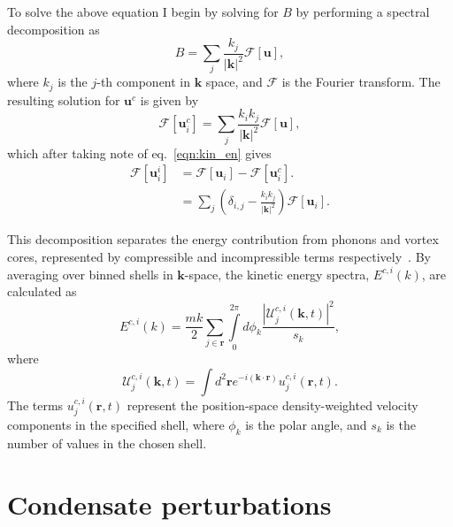 To solve the above equation I begin by solving for $B$ by performing a spectral decomposition as
\begin{equation}
    B = \displaystyle\sum\limits_{j} \frac{k_j}{|\mathbf{k}|^2}\mathscr{F}[\mathbf{u}],
\end{equation}
where $k_j$ is the $j$-th component in $\mathbf{k}$ space, and $\mathscr{F}$ is the Fourier transform. The resulting solution for $\mathbf{u}^c$ is given by
\begin{equation}
    \mathscr{F}[\mathbf{u}_i^c] = \displaystyle\sum\limits_{j} \frac{k_i k_j}{|\mathbf{k}|^2} \mathscr{F}[\mathbf{u}],
\end{equation}
which after taking note of eq.~\ref{eqn:kin_en} gives
\begin{align}
    \mathscr{F}[\mathbf{u}_i^i] &= \mathscr{F}[\mathbf{u}_i] - \mathscr{F}[\mathbf{u}_i^c]. \\
    &= \displaystyle\sum\limits_{j}\left(\delta_{i,j} - \frac{k_ik_j}{|\mathbf{k}|^2}\right)\mathscr{F}[\mathbf{u}_i].
\end{align}

This decomposition separates the energy contribution from phonons and vortex cores, represented by compressible and incompressible terms respectively~\cite{CT:Horng_pra_2009}. By averaging over binned shells in $\mathbf{k}$-space, the kinetic energy spectra, $E^{c,i}(k)$, are calculated as~\cite{CT:Bradley_prx_2012}
\begin{equation}
	E^{c,i}(k) = \frac{mk}{2}\sum\limits_{j\in\mathbf{r}} \int\limits_{0}^{2\pi}d\phi_k \frac{ |\mathcal{U}_j^{c,i}(\mathbf{k},t) |^2}{s_k},
\end{equation}
where
\begin{equation}
	\mathcal{U}_j^{c,i}(\mathbf{k},t) = \int d^2 \mathbf{r} e^{-i(\mathbf{k}\cdot\mathbf{r})} u_j^{c,i}(\mathbf{r},t).
\end{equation}
The terms $u_j^{c,i}(\mathbf{r},t)$ represent the position-space density-weighted velocity components in the specified shell, where $\phi_k$ is the polar angle, and $s_k$ is the number of values in the chosen shell.

\section{Condensate perturbations}
